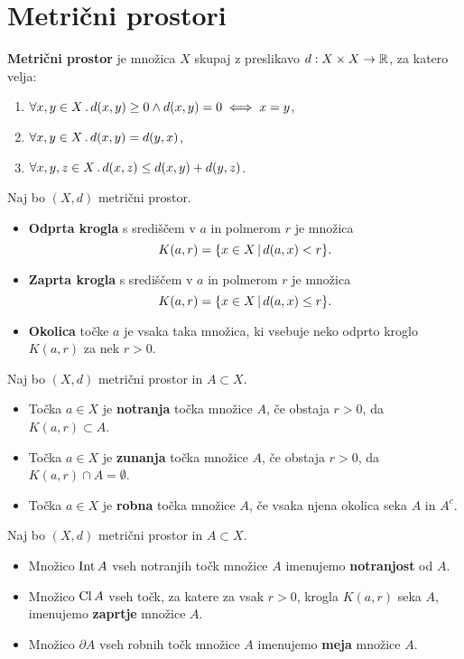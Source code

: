 \section*{Metrični prostori}
\begin{definicija}
    \textbf{Metrični prostor} je množica $X$ skupaj z preslikavo $d: X \times X \to \mathbb{R}$, za katero velja:
    \begin{enumerate}
        \item $\forall x, y \in X \,.\, d(x,y) \geq 0 \land d(x, y) = 0 \iff x=y$,
        \item $\forall x, y \in X \,.\,  d(x, y) = d(y, x)$,
        \item $\forall x, y, z \in X \,.\,  d(x, z) \leq d(x, y) + d(y, z)$.
    \end{enumerate}
\end{definicija}

\begin{definicija}
    Naj bo $(X, d)$ metrični prostor. 
    \begin{itemize}
        \item \textbf{Odprta krogla} s središčem v $a$ in polmerom $r$ je množica $$K(a, r) = \{x \in X \,|\, d(a,x) < r\}.$$
        \item \textbf{Zaprta krogla} s središčem v $a$ in polmerom $r$ je množica $$K(a, r) = \{x \in X \,|\, d(a,x) \leq r\}.$$
        \item \textbf{Okolica} točke $a$ je vsaka taka množica, ki vsebuje neko odprto kroglo $K(a, r)$ za nek $r>0$.
    \end{itemize}    
\end{definicija}

\begin{definicija}
    Naj bo $(X, d)$ metrični prostor in $A \subset X$.
    \begin{itemize}
        \item Točka $a \in X$ je \textbf{notranja} točka množice $A$, če obstaja $r>0$, da $K(a,r) \subset A$.
        \item Točka $a \in X$ je \textbf{zunanja} točka množice $A$, če obstaja $r>0$, da $K(a,r) \cap A = \emptyset$.
        \item Točka $a \in X$ je \textbf{robna} točka množice $A$, če vsaka njena okolica seka $A$ in $A^c$.
    \end{itemize}
\end{definicija}

\begin{definicija}
    Naj bo $(X, d)$ metrični prostor in $A \subset X$.
    \begin{itemize}
        \item Množico $\operatorname{Int} A$ vseh notranjih točk množice $A$ imenujemo \textbf{notranjost} od $A$.
        \item Množico $\operatorname{Cl} A$ vseh točk, za katere za vsak $r>0$, krogla $K(a, r)$ seka $A$, imenujemo \textbf{zaprtje} množice $A$.
        \item Množico $\partial A$ vseh robnih točk množice $A$ imenujemo \textbf{meja} množice $A$.     
    \end{itemize}
\end{definicija}

